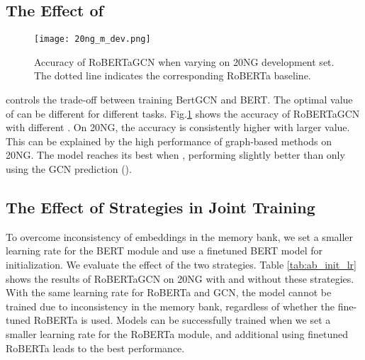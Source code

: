 \documentclass[11pt,a4paper]{article}
\begin{document}
\subsection{The Effect of }
\begin{figure}
    \centering
        \texttt{[image: 20ng\_m\_dev.png]}
    \caption{Accuracy of RoBERTaGCN when varying  on 20NG development set. The dotted line indicates the corresponding RoBERTa baseline.\footnotemark}
    \label{fig:lambda}
\end{figure}

 controls the trade-off between training BertGCN and BERT. The optimal value of  can be different for different tasks. Fig.\ref{fig:lambda} shows the accuracy of RoBERTaGCN with different . On 20NG, the accuracy is consistently higher with larger  value. This can be explained by the high performance of graph-based methods on 20NG. 
The model reaches its best when , performing slightly better than only using the GCN prediction (). 


\subsection{The Effect of Strategies in Joint Training }
\begin{table}
  \small
  \centering
  \caption{Accuracy on 20NG development set for different strategies. ``finetune'' means we use the finetuned RoBERTa as initialization, and ``small lr.'' means we use a smaller learning rate for the RoBERTa module.}
  \label{tab:ab_init_lr}
\end{table}

To overcome inconsistency of embeddings in the memory bank, we set a smaller learning rate for the BERT module and use a finetuned BERT model for initialization. We evaluate the effect of the two strategies. Table \ref{tab:ab_init_lr} shows the  results of RoBERTaGCN on 20NG with and without these strategies. 
With the same learning rate for RoBERTa and GCN, the model cannot be trained due to inconsistency in the memory bank, regardless of whether the fine-tuned RoBERTa is used. Models can be successfully trained when we set a smaller learning rate for the RoBERTa module, and additional using finetuned RoBERTa leads to the best performance.
\end{document}
